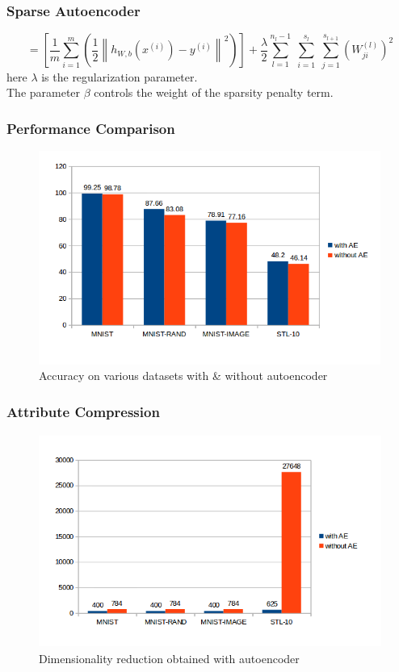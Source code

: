 \documentclass{beamer}
\begin{document}
\begin{frame}
\frametitle{Sparse Autoencoder}
\[= \left[ \frac{1}{m} \sum_{i=1}^m \left( \frac{1}{2} \left\| h_{W,b}(x^{(i)}) - y^{(i)} \right\|^2 \right) \right]
                       + \frac{\lambda}{2} \sum_{l=1}^{n_l-1} \; \sum_{i=1}^{s_l} \; \sum_{j=1}^{s_{l+1}} \left( W^{(l)}_{ji} \right)^2 \]
here $\lambda$ is the regularization parameter.\\
The parameter $\textstyle{\beta}$ controls the weight of the sparsity penalty term.

\end{frame}


\begin{frame}
\frametitle{Performance Comparison}
\begin{figure}
\includegraphics[width=0.8\linewidth, height=7cm]{figures/acc_comparison}
\caption{Accuracy on various datasets with \& without autoencoder}
\end{figure}
\end{frame}

\begin{frame}
\frametitle{Attribute Compression}
\begin{figure}
\includegraphics[width=0.8\linewidth, height=7cm]{figures/att_compression}
\caption{Dimensionality reduction obtained with autoencoder}
\end{figure}
\end{frame}
\end{document}
